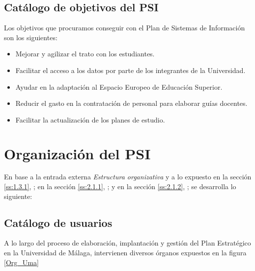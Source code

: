 \documentclass[11pt,a4paper,spanish,twoside]{book}
\begin{document}
\subsection{Catálogo de objetivos del PSI} \label{ss:2.1.2}
Los objetivos que procuramos conseguir con el Plan de Sistemas de Información 
son los siguientes:
\begin{itemize}
  \item Mejorar y agilizar el trato con los estudiantes.
  \item Facilitar el acceso a los datos por parte de los integrantes de la 
    Universidad.
  \item Ayudar en la adaptación al Espacio Europeo de Educación Superior.
  \item Reducir el gasto en la contratación de personal para elaborar guías 
    docentes.
  \item Facilitar la actualización de los planes de estudio.
\end{itemize}

\section{Organización del PSI}
En base a la entrada externa \emph{Estructura organizativa} y a lo expuesto
en la sección \vref{ss:1.3.1}, \emph{}; en la sección
\vref{ss:2.1.1}, \emph{}; y en la sección \vref{ss:2.1.2},
\emph{}; se desarrolla lo siguiente:

\subsection{Catálogo de usuarios} \label{ss:2.2.1}
A lo largo del proceso de elaboración, implantación y gestión del Plan 
Estratégico en la Universidad de Málaga, intervienen diversos órganos expuestos 
en la figura \ref{Org_Uma}

\end{document}
